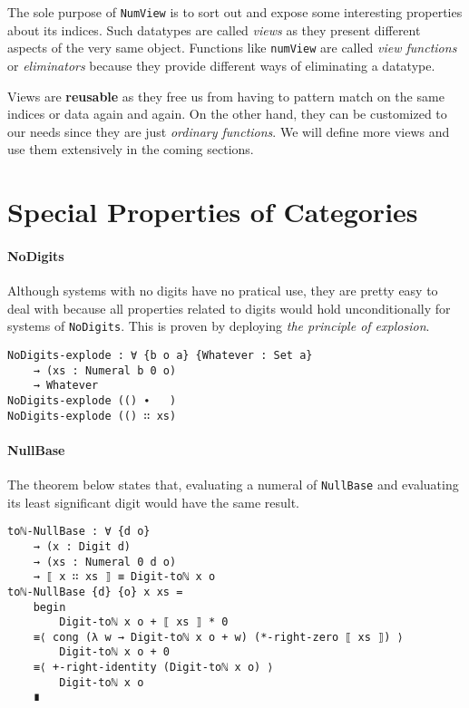 \documentclass[../thesis.tex]{subfiles}
\begin{document}
The sole purpose of {\lstinline|NumView|} is to sort out and expose some
interesting properties about its indices.
Such datatypes are called \textit{views}\cite{wadler1987views} as they present
different aspects of the very same object.
Functions like {\lstinline|numView|} are called \textit{view functions} or
\textit{eliminators}\cite{mcbride2004views} because they provide different ways
of eliminating a datatype.

Views are \textbf{reusable} as they free us from having to pattern match on the
same indices or data again and again. On the other hand, they can be customized
to our needs since they are just \textit{ordinary functions}.
We will define more views and use them extensively in the coming sections.

\section{Special Properties of Categories}

\paragraph{NoDigits}

Although systems with no digits have no pratical use, they are pretty easy to deal
with because all properties related to digits would hold unconditionally for
systems of {\lstinline|NoDigits|}.
This is proven by deploying \textit{the principle of explosion}.

\begin{lstlisting}
NoDigits-explode : ∀ {b o a} {Whatever : Set a}
    → (xs : Numeral b 0 o)
    → Whatever
NoDigits-explode (() ∙   )
NoDigits-explode (() ∷ xs)
\end{lstlisting}

\paragraph{NullBase}

The theorem below states that, evaluating a numeral of {\lstinline|NullBase|}
and evaluating its least significant digit would have the same result.

\begin{lstlisting}
toℕ-NullBase : ∀ {d o}
    → (x : Digit d)
    → (xs : Numeral 0 d o)
    → ⟦ x ∷ xs ⟧ ≡ Digit-toℕ x o
toℕ-NullBase {d} {o} x xs =
    begin
        Digit-toℕ x o + ⟦ xs ⟧ * 0
    ≡⟨ cong (λ w → Digit-toℕ x o + w) (*-right-zero ⟦ xs ⟧) ⟩
        Digit-toℕ x o + 0
    ≡⟨ +-right-identity (Digit-toℕ x o) ⟩
        Digit-toℕ x o
    ∎
\end{lstlisting}
\end{document}
